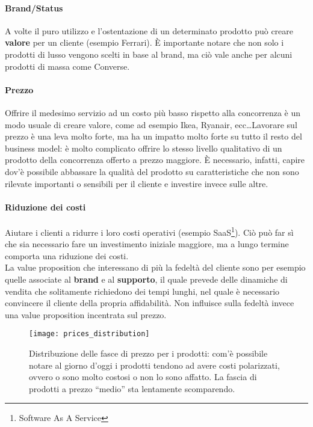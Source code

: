 \paragraph*{Brand/Status} A volte il puro utilizzo e l'ostentazione di un
determinato prodotto può creare \textbf{valore} per un cliente (esempio
Ferrari). È importante notare che non solo i prodotti di lusso vengono scelti
in base al brand, ma ciò vale anche per alcuni prodotti di massa come Converse.

\paragraph*{Prezzo} Offrire il medesimo servizio ad un costo più basso rispetto
alla concorrenza è un modo usuale di creare valore, come ad esempio Ikea,
Ryanair, ecc\dots Lavorare sul prezzo è una leva molto forte, ma ha un impatto
molto forte su tutto il resto del business model: è molto complicato offrire lo
stesso livello qualitativo di un prodotto della concorrenza offerto a prezzo
maggiore. È necessario, infatti, capire dov'è possibile abbassare la qualità
del prodotto su caratteristiche che non sono rilevate importanti o sensibili
per il cliente e investire invece sulle altre.

\paragraph*{Riduzione dei costi} Aiutare i clienti a ridurre i loro costi
operativi (esempio SaaS\footnote{Software As A Service}). Ciò può far sì che
sia necessario fare un investimento iniziale maggiore, ma a lungo termine
comporta una riduzione dei costi.\\[0.3cm]

La value proposition che interessano di più la fedeltà del cliente sono per
esempio quelle associate al \textbf{brand} e al \textbf{supporto}, il quale
prevede delle dinamiche di vendita che solitamente richiedono dei tempi lunghi,
nel quale è necessario convincere il cliente della propria affidabilità. Non
influisce sulla fedeltà invece una value proposition incentrata sul prezzo.

\begin{figure}[t]
 \centering
 \texttt{[image: prices\_distribution]}
 \caption[Distribuzione dei prezzi]{Distribuzione delle fasce di prezzo per i 
prodotti: com'è possibile notare al giorno d'oggi i prodotti tendono ad avere 
costi polarizzati, ovvero o sono molto costosi o non lo sono affatto. La fascia 
di prodotti a prezzo ``medio'' sta lentamente scomparendo.}
 \label{fig:vp:pd}
\end{figure}

